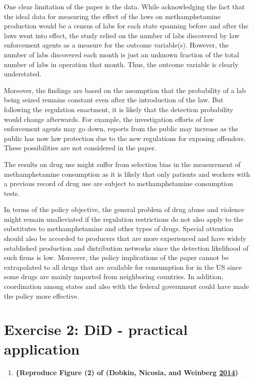 \documentclass[
  11pt,
]{article}
\providecommand{\tightlist}{%
  \setlength{\itemsep}{0pt}\setlength{\parskip}{0pt}}
\begin{document}
One clear limitation of the paper is the data. While acknowledging the
fact that the ideal data for measuring the effect of the laws on
methamphetamine production would be a census of labs for each state
spanning before and after the laws went into effect, the study relied on
the number of labs discovered by law enforcement agents as a measure for
the outcome variable(s). However, the number of labs discovered each
month is just an unknown fraction of the total number of labs in
operation that month. Thus, the outcome variable is clearly understated.

Moreover, the findings are based on the assumption that the probability
of a lab being seized remains constant even after the introduction of
the law. But following the regulation enactment, it is likely that the
detection probability would change afterwards. For example, the
investigation efforts of law enforcement agents may go down, reports
from the public may increase as the public has now law protection due to
the new regulations for exposing offenders. These possibilities are not
considered in the paper.

The results on drug use might suffer from selection bias in the
measurement of methamphetamine consumption as it is likely that only
patients and workers with a previous record of drug use are subject to
methamphetamine consumption tests.

In terms of the policy objective, the general problem of drug abuse and
violence might remain unalleviated if the regulation restrictions do not
also apply to the substitutes to methamphetamine and other types of
drugs. Special attention should also be accorded to producers that are
more experienced and have widely established production and distribution
networks since the detection likelihood of such firms is low. Moreover,
the policy implications of the paper cannot be extrapolated to all drugs
that are available for consumption for in the US since some drugs are
mainly imported from neighboring countries. In addition, coordination
among states and also with the federal government could have made the
policy more effective.

\hypertarget{exercise-2-did---practical-application}{%
\section{Exercise 2: DiD - practical
application}\label{exercise-2-did---practical-application}}

\begin{enumerate}
\def\labelenumi{(\alph{enumi})}
\tightlist
\item
  \textbf{\{Reproduce Figure (2) of (Dobkin, Nicosia, and Weinberg
  \protect\hyperlink{ref-DOBKIN201448}{2014})}
\end{enumerate}
\end{document}
